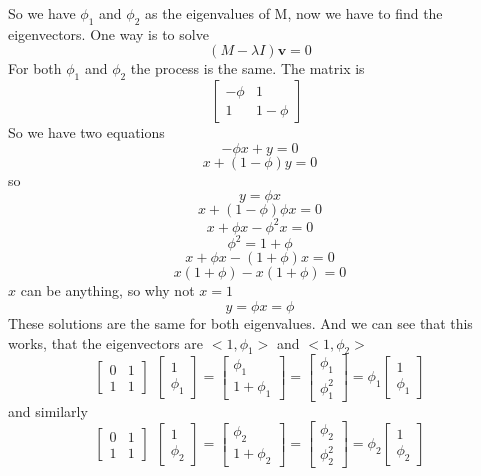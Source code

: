 \documentclass[11pt, oneside]{article}
\begin{document}
So we have $\phi_1$ and $\phi_2$ as the eigenvalues of M, now we have to find the eigenvectors.  One way is to solve
\[ (M - \lambda I)\mathbf{v} = 0 \]
For both $\phi_1$ and $\phi_2$ the process is the same.  The matrix is
\[
\begin{bmatrix} 
  -\phi  &  1 \\ 
  1  &  1 - \phi 
\end{bmatrix} \ \ 
\]
So we have two equations
\[ -\phi x + y = 0 \]
\[ x + (1-\phi)y = 0 \]
so
\[y = \phi x \]
\[ x + (1 - \phi) \phi x = 0 \]
\[ x + \phi x - \phi^2 x = 0 \]
\[ \phi^2 = 1 + \phi \]
\[ x + \phi x -(1 + \phi) x = 0 \]
\[ x(1 + \phi) - x(1 + \phi) = 0 \]
$x$ can be anything, so why not $x=1$
\[ y = \phi x = \phi \]
These solutions are the same for both eigenvalues.  And we can see that this works, that the eigenvectors are $<1,\phi_1>$ and $<1,\phi_2>$
\[
\begin{bmatrix} 
  0  &  1 \\ 
  1  &  1 
\end{bmatrix} \ \ 
\begin{bmatrix} 
  1 \\ 
  \phi_1 
\end{bmatrix}
=
\begin{bmatrix} 
  \phi_1 \\ 
  1 + \phi_1 
\end{bmatrix}
=
\begin{bmatrix} 
  \phi_1 \\ 
  \phi_1^2
\end{bmatrix}
= \phi_1
\begin{bmatrix} 
  1 \\ 
  \phi_1
\end{bmatrix}
\]
and similarly
\[
\begin{bmatrix} 
  0  &  1 \\ 
  1  &  1 
\end{bmatrix} \ \ 
\begin{bmatrix} 
  1 \\ 
  \phi_2 
\end{bmatrix}
=
\begin{bmatrix} 
  \phi_2 \\ 
  1 + \phi_2 
\end{bmatrix}
=
\begin{bmatrix} 
  \phi_2 \\ 
  \phi_2^2
\end{bmatrix}
= \phi_2
\begin{bmatrix} 
  1 \\ 
  \phi_2
\end{bmatrix}
\]
\end{document}
